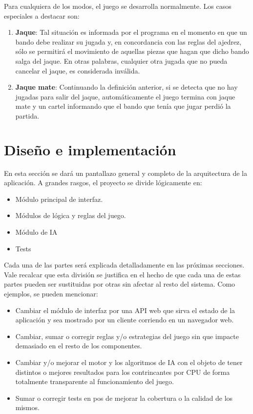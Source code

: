 \documentclass{llncs}
\begin{document}
Para cualquiera de los modos, el juego se desarrolla normalmente. Los casos especiales a destacar son:

\begin{enumerate}
  \item \textbf{Jaque}: Tal situación es informada por el programa en el momento en que un bando debe realizar su jugada y, en concordancia con las reglas del ajedrez, sólo se permitirá el movimiento de aquellas piezas que hagan que dicho bando salga del jaque. En otras palabras, cualquier otra jugada que no pueda cancelar el jaque, es considerada inválida.
  \item \textbf{Jaque mate}: Continuando la definición anterior, si se detecta que no hay jugadas para salir del jaque, automáticamente el juego termina con jaque mate y un cartel informando que el bando que tenía que jugar perdió la partida.
\end{enumerate}

\section{Diseño e implementación}

En esta sección se dará un pantallazo general y completo de la arquitectura de la aplicación. A grandes rasgos, el proyecto se divide lógicamente en:

\begin{itemize}
  \item Módulo principal de interfaz.
  \item Módulos de lógica y reglas del juego.
  \item Módulo de IA
  \item Tests
\end{itemize}

Cada una de las partes será explicada detalladamente en las próximas secciones. Vale recalcar que esta división se justifica en el hecho de que cada una de estas partes pueden ser sustituidas por otras sin afectar al resto del sistema. Como ejemplos, se pueden mencionar:

\begin{itemize}
  \item Cambiar el módulo de interfaz por una API web que sirva el estado de la aplicación y sea mostrado por un cliente corriendo en un navegador web.
  \item Cambiar, sumar o corregir reglas y/o estrategias del juego sin que impacte demasiado en el resto de los componentes.
  \item Cambiar y/o mejorar el motor y los algoritmos de IA con el objeto de tener distintos o mejores resultados para los contrincantes por CPU de forma totalmente transparente al funcionamiento del juego.
  \item Sumar o corregir tests en pos de mejorar la cobertura o la calidad de los mismos.
\end{itemize}
\end{document}
